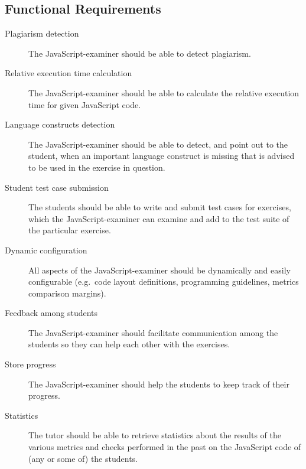 \subsection{Functional Requirements}
\begin{description}
  \item[Plagiarism detection] The JavaScript-examiner should be able to detect
    plagiarism.
  \item[Relative execution time calculation] The JavaScript-examiner should be 
    able to calculate the relative execution time for given JavaScript code.
  \item[Language constructs detection] The JavaScript-examiner should be able
    to detect, and point out to the student, when an important language
    construct is missing that is advised to be used in the exercise in
    question.
  \item[Student test case submission] The students should be able to write and
    submit test cases for exercises, which the JavaScript-examiner can examine
    and add to the test suite of the particular exercise.
  \item[Dynamic configuration] All aspects of the JavaScript-examiner should be
    dynamically and easily configurable (e.g.\ code layout definitions,
    programming guidelines, metrics comparison margins).
  \item[Feedback among students] The JavaScript-examiner should facilitate 
    communication among the students so they can help each other with the 
    exercises. 
  \item[Store progress] The JavaScript-examiner should help the students to
    keep track of their progress.
  \item[Statistics] The tutor should be able to retrieve statistics about the
    results of the various metrics and checks performed in the past on the
    JavaScript code of (any or some of) the students.
\end{description}
